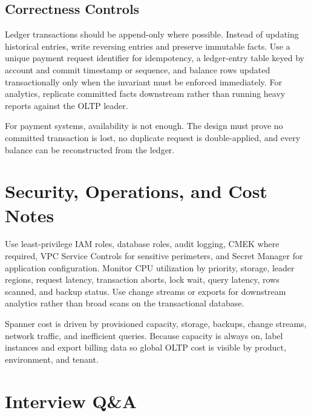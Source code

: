 \subsection{Correctness Controls}
Ledger transactions should be append-only where possible. Instead of updating historical entries, write reversing entries and preserve immutable facts. Use a unique payment request identifier for idempotency, a ledger-entry table keyed by account and commit timestamp or sequence, and balance rows updated transactionally only when the invariant must be enforced immediately. For analytics, replicate committed facts downstream rather than running heavy reports against the OLTP leader.

\begin{tipbox}
For payment systems, availability is not enough. The design must prove no committed transaction is lost, no duplicate request is double-applied, and every balance can be reconstructed from the ledger.
\end{tipbox}

\section{Security, Operations, and Cost Notes}
Use least-privilege IAM roles, database roles, audit logging, CMEK where required, VPC Service Controls for sensitive perimeters, and Secret Manager for application configuration. Monitor CPU utilization by priority, storage, leader regions, request latency, transaction aborts, lock wait, query latency, rows scanned, and backup status. Use change streams or exports for downstream analytics rather than broad scans on the transactional database.

\begin{notebox}
Spanner cost is driven by provisioned capacity, storage, backups, change streams, network traffic, and inefficient queries. Because capacity is always on, label instances and export billing data so global OLTP cost is visible by product, environment, and tenant.
\end{notebox}

\section{Interview Q\&A}
